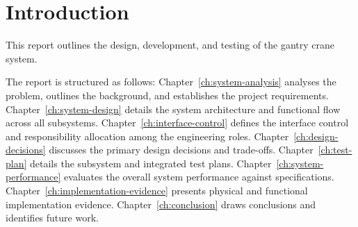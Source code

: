\chapter{Introduction}
\label{ch:introduction}

This report outlines the design, development, and testing of the gantry crane system.

The report is structured as follows:
Chapter~\ref{ch:system-analysis} analyses the problem, outlines the background, and establishes the project requirements.
Chapter~\ref{ch:system-design} details the system architecture and functional flow across all subsystems.
Chapter~\ref{ch:interface-control} defines the interface control and responsibility allocation among the engineering roles.
Chapter~\ref{ch:design-decisions} discusses the primary design decisions and trade-offs.
Chapter~\ref{ch:test-plan} details the subsystem and integrated test plans.
Chapter~\ref{ch:system-performance} evaluates the overall system performance against specifications.
Chapter~\ref{ch:implementation-evidence} presents physical and functional implementation evidence.
Chapter~\ref{ch:conclusion} draws conclusions and identifies future work.
